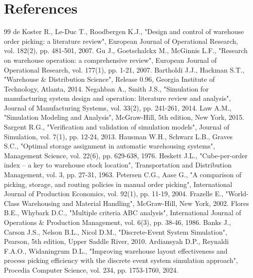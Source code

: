 \section{References}\label{sec:references}
\begingroup
\renewcommand{\section}[2]{}%
\begin{thebibliography}{99}
\setlength{\itemsep}{2pt}
 de Koster R., Le-Duc T., Roodbergen K.J., "Design and control of warehouse order picking: a literature review", European Journal of Operational Research, vol. 182(2), pp. 481-501, 2007.
 Gu J., Goetschalckx M., McGinnis L.F., "Research on warehouse operation: a comprehensive review", European Journal of Operational Research, vol. 177(1), pp. 1-21, 2007.
 Bartholdi J.J., Hackman S.T., "Warehouse \& Distribution Science", Release 0.96, Georgia Institute of Technology, Atlanta, 2014.
 Negahban A., Smith J.S., "Simulation for manufacturing system design and operation: literature review and analysis", Journal of Manufacturing Systems, vol. 33(2), pp. 241-261, 2014.
 Law A.M., "Simulation Modeling and Analysis", McGraw-Hill, 5th edition, New York, 2015.
 Sargent R.G., "Verification and validation of simulation models", Journal of Simulation, vol. 7(1), pp. 12-24, 2013.
 Hausman W.H., Schwarz L.B., Graves S.C., "Optimal storage assignment in automatic warehousing systems", Management Science, vol. 22(6), pp. 629-638, 1976.
 Heskett J.L., "Cube-per-order index -- a key to warehouse stock location", Transportation and Distribution Management, vol. 3, pp. 27-31, 1963.
 Petersen C.G., Aase G., "A comparison of picking, storage, and routing policies in manual order picking", International Journal of Production Economics, vol. 92(1), pp. 11-19, 2004.
 Frazelle E., "World-Class Warehousing and Material Handling", McGraw-Hill, New York, 2002.
 Flores B.E., Whybark D.C., "Multiple criteria ABC analysis", International Journal of Operations \& Production Management, vol. 6(3), pp. 38-46, 1986.
 Banks J., Carson J.S., Nelson B.L., Nicol D.M., "Discrete-Event System Simulation", Pearson, 5th edition, Upper Saddle River, 2010.
 Ardiansyah D.P., Reynaldi F.A.O., Widaningrum D.L., "Improving warehouse layout effectiveness and process picking efficiency with the discrete event system simulation approach", Procedia Computer Science, vol. 234, pp. 1753-1760, 2024.

\end{thebibliography}
